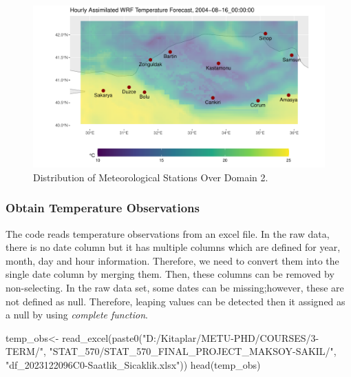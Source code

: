 \documentclass[
  letterpaper,
  DIV=11,
  numbers=noendperiod,
  abstract]{scrartcl}
\newenvironment{Shaded}{\begin{snugshade}}{\end{snugshade}}
\newcommand{\FunctionTok}[1]{\textcolor[rgb]{0.28,0.35,0.67}{#1}}
\newcommand{\NormalTok}[1]{\textcolor[rgb]{0.00,0.23,0.31}{#1}}
\newcommand{\OtherTok}[1]{\textcolor[rgb]{0.00,0.23,0.31}{#1}}
\newcommand{\StringTok}[1]{\textcolor[rgb]{0.13,0.47,0.30}{#1}}
\begin{document}
\begin{figure}[H]

{\centering \includegraphics{WRF_pdf_files/figure-pdf/fig-gauges-1.pdf}

}

\caption{\label{fig-gauges}Distribution of Meteorological Stations Over
Domain 2.}

\end{figure}

\hypertarget{obtain-temperature-observations}{%
\subsubsection{Obtain Temperature
Observations}\label{obtain-temperature-observations}}

The code reads temperature observations from an excel file. In the raw
data, there is no date column but it has multiple columns which are
defined for year, month, day and hour information. Therefore, we need to
convert them into the single date column by merging them. Then, these
columns can be removed by non-selecting. In the raw data set, some dates
can be missing;however, these are not defined as null. Therefore,
leaping values can be detected then it assigned as a null by using
\emph{complete function}.

\begin{Shaded}
\begin{Highlighting}[]
\NormalTok{temp\_obs}\OtherTok{\textless{}{-}} \FunctionTok{read\_excel}\NormalTok{(}\FunctionTok{paste0}\NormalTok{(}\StringTok{"D:/Kitaplar/METU{-}PHD/COURSES/3{-}TERM/"}\NormalTok{,}
\StringTok{"STAT\_570/STAT\_570\_FINAL\_PROJECT\_MAKSOY{-}SAKIL/"}\NormalTok{,}
\StringTok{"df\_2023122096C0{-}Saatlik\_Sicaklik.xlsx"}\NormalTok{))}
\FunctionTok{head}\NormalTok{(temp\_obs)}
\end{Highlighting}
\end{Shaded}
\end{document}
